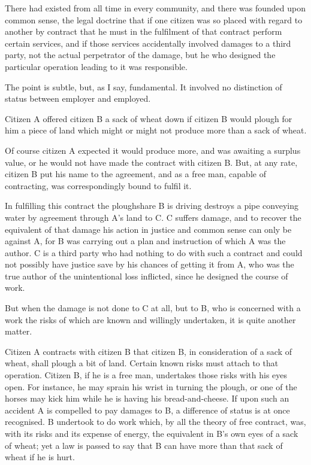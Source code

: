 \documentclass{book}
\begin{document}
There had existed from all time in every community, and there was founded upon common sense, the legal doctrine that if one citizen was so placed with regard to another by contract that he must in the fulfilment of that contract perform certain services, and if those services accidentally involved damages to a third party, not the actual perpetrator of the damage, but he who designed the particular operation leading to it was responsible.

The point is subtle, but, as I say, fundamental. It involved no distinction of status between employer and employed.

Citizen A offered citizen B a sack of wheat down if citizen B would plough for him a piece of land which might or might not produce more than a sack of wheat.

Of course citizen A expected it would produce more, and was awaiting a surplus value, or he would not have made the contract with citizen B. But, at any rate, citizen B put his name to the agreement, and as a free man, capable of contracting, was correspondingly bound to fulfil it.

In fulfilling this contract the ploughshare B is driving destroys a pipe conveying water by agreement through A’s land to C. C suffers damage, and to recover the equivalent of that damage his action in justice and common sense can only be against A, for B was carrying out a plan and instruction of which A was the author. C is a third party who had nothing to do with such a contract and could not possibly have justice save by his chances of getting it from A, who was the true author of the unintentional loss inflicted, since he designed the course of work.

But when the damage is not done to C at all, but to B, who is concerned with a work the risks of which are known and willingly undertaken, it is quite another matter.

Citizen A contracts with citizen B that citizen B, in consideration of a sack of wheat, shall plough a bit of land. Certain known risks must attach to that operation. Citizen B, if he is a free man, undertakes those risks with his eyes open. For instance, he may sprain his wrist in turning the plough, or one of the horses may kick him while he is having his bread-and-cheese. If upon such an accident A is compelled to pay damages to B, a difference of status is at once recognised. B undertook to do work which, by all the theory of free contract, was, with its risks and its expense of energy, the equivalent in B’s own eyes of a sack of wheat; yet a law is passed to say that B can have more than that sack of wheat if he is hurt.
\end{document}
